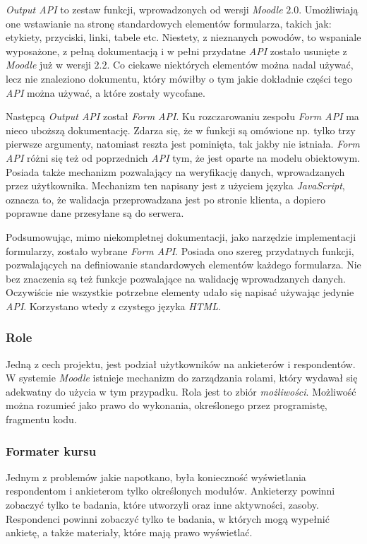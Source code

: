 \emph{Output API} to zestaw funkcji, wprowadzonych od wersji \emph{Moodle} $2.0$. Umożliwiają one wstawianie na stronę standardowych elementów formularza, takich jak: etykiety, przyciski, linki, tabele etc. Niestety, z nieznanych powodów, to wspaniale wyposażone, z pełną dokumentacją i w pełni przydatne \emph{API} zostało usunięte z \emph{Moodle} już w wersji $2.2$. Co ciekawe niektórych elementów można nadal używać, lecz nie znaleziono dokumentu, który mówiłby o tym jakie dokładnie części tego \emph{API} można używać, a które zostały wycofane.

Następcą \emph{Output API} został \emph{Form API}. Ku rozczarowaniu zespołu \emph{Form API} ma nieco uboższą dokumentację. Zdarza się, że w funkcji są omówione np. tylko trzy pierwsze argumenty, natomiast reszta jest pominięta, tak jakby nie istniała. \emph{Form API} różni się też od poprzednich \emph{API} tym, że jest oparte na modelu obiektowym. Posiada także mechanizm pozwalający na weryfikację danych, wprowadzanych przez użytkownika. Mechanizm ten napisany jest z użyciem języka \emph{JavaScript}, oznacza to, że walidacja przeprowadzana jest po stronie klienta, a dopiero poprawne dane przesyłane są do serwera.

Podsumowując, mimo niekompletnej dokumentacji, jako narzędzie implementacji formularzy, zostało wybrane \emph{Form API}. Posiada ono szereg przydatnych funkcji, pozwalających na definiowanie standardowych elementów każdego formularza. Nie bez znaczenia są też funkcje pozwalające na walidację wprowadzanych danych. Oczywiście nie wszystkie potrzebne elementy udało się napisać używając jedynie \emph{API}. Korzystano wtedy z czystego języka \emph{HTML}. 

\subsubsection{Role}
Jedną z cech projektu, jest podział użytkowników na ankieterów i respondentów. W systemie \emph{Moodle} istnieje mechanizm do zarządzania rolami, który wydawał się adekwatny do użycia w tym przypadku. Rola jest to zbiór \emph{możliwości}. Możliwość można rozumieć jako prawo do wykonania, określonego przez programistę, fragmentu kodu.

\subsubsection{Formater kursu}
Jednym z problemów jakie napotkano, była konieczność wyświetlania respondentom i ankieterom tylko określonych modułów. Ankieterzy powinni zobaczyć tylko te badania, które utworzyli oraz inne aktywności, zasoby. Respondenci powinni zobaczyć tylko te badania, w których mogą wypełnić ankietę, a także materiały, które mają prawo wyświetlać.

